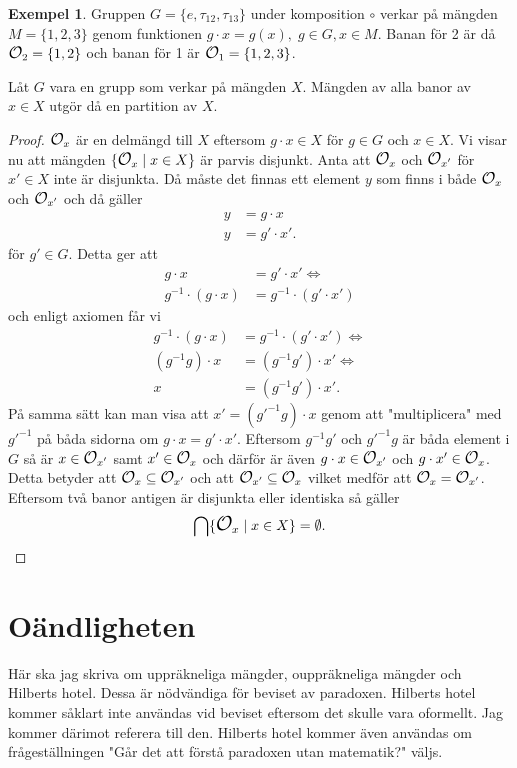 \documentclass{article}
\newcommand{\orbit}[0]{\mathlarger{\mathlarger{\mathcal{O}}}}
\theoremstyle{definition}
\newtheorem{exmp}[thm]{Exempel}
\begin{document}
\begin{exmp}
  Gruppen $G = \{e, \tau_{12}, \tau_{13}\}$ under komposition $\circ$ verkar på 
  mängden $M = \{1, 2, 3\}$ genom funktionen $g \cdot x = g(x), \; g \in G, x \in M$. 
  Banan för 2 är då $\orbit_2 = \{1, 2\}$ och banan för 1 är $\orbit_1 = \{1, 2, 3\}$.
\end{exmp}

\begin{mytheo}{}{}
  Låt $G$ vara en grupp som verkar på mängden $X$. Mängden av alla banor av $x \in X$
  utgör då en partition av $X$. 
\end{mytheo}
\begin{proof}
  $\orbit_x$ är en delmängd till $X$ eftersom $g \cdot x \in X$ för $g \in G$ och $x \in X$.
  Vi visar nu att mängden $\{\orbit_x \; | \; x \in X\}$ är parvis disjunkt. 
  Anta att $\orbit_x$
  och $\orbit_{x'}$ för $x' \in X$ inte är disjunkta. Då måste det finnas 
  ett element $y$ som finns i både $\orbit_x$ och $\orbit_{x'}$ och då gäller 
  \begin{align*}
    y &= g \cdot x \\
    y &= g' \cdot x'.
  \end{align*}
  för $g' \in G.$ Detta ger att 
  \begin{align*}
    g \cdot x &= g' \cdot x' \iff \\
    g^{-1} \cdot (g \cdot x) &= g^{-1} \cdot (g' \cdot x')
  \end{align*}
  och enligt axiomen får vi 
  \begin{align*}
    g^{-1} \cdot (g \cdot x) &= g^{-1} \cdot (g' \cdot x') \iff \\
    (g^{-1} g) \cdot x &= (g^{-1} g') \cdot x' \iff \\
    x &= (g^{-1} g') \cdot x'.
  \end{align*} 
  På samma sätt kan man visa att $x' = (g'^{-1}g) \cdot x$ genom att 
  "multiplicera" med $g'^{-1}$ på båda sidorna om $g \cdot x = g' \cdot x'$. 
  Eftersom $g^{-1} g'$ och $g'^{-1}g$ är båda element i $G$ så är 
  $x \in \orbit_{x'}$ samt $x' \in \orbit_x$ och därför är även $g \cdot x \in \orbit_{x'}$
  och $g \cdot x' \in \orbit_{x}$. Detta betyder att $\orbit_x \subseteq \orbit_{x'}$ och att 
  $\orbit_{x'} \subseteq \orbit_x$ vilket medför att $\orbit_x = \orbit_{x'}$.
  Eftersom två banor antigen är disjunkta eller identiska så gäller 
  \[\bigcap \{\orbit_x \; | \; x \in X\} = \emptyset.\]
\end{proof}

\section{Oändligheten}
Här ska jag skriva om uppräkneliga mängder, ouppräkneliga mängder och Hilberts hotel. Dessa är nödvändiga för beviset av paradoxen. Hilberts hotel
kommer såklart inte användas vid beviset eftersom det skulle vara oformellt. Jag kommer därimot referera till den. Hilberts hotel kommer även användas om
frågeställningen "Går det att förstå paradoxen utan matematik?" väljs. 
\end{document}
